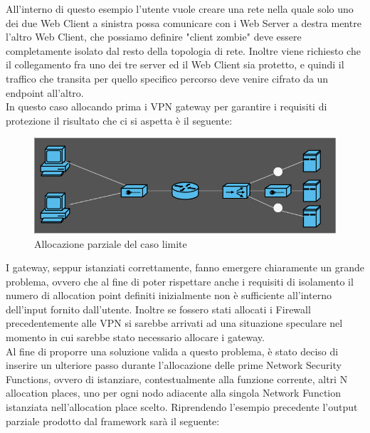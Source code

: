 All'interno di questo esempio l'utente vuole creare una rete nella quale solo uno dei due Web Client a sinistra possa comunicare con i Web Server a destra mentre l'altro Web Client,
che possiamo definire "client zombie" deve essere completamente isolato dal resto della topologia di rete. Inoltre viene richiesto che il collegamento fra uno dei tre server ed il Web Client
sia protetto, e quindi il traffico che transita per quello specifico percorso deve venire cifrato da un endpoint all'altro.\\
In questo caso allocando prima i VPN gateway per garantire i requisiti di protezione il risultato che ci si aspetta è il seguente:


\begin{figure}[h]  %
    \centering
    \includegraphics[width=1\textwidth]{CasoLimite2.png}  %
    \caption{Allocazione parziale del caso limite}
    \label{fig:CasoLimite2}
\end{figure}

I gateway, seppur istanziati correttamente, fanno emergere chiaramente un grande problema, ovvero che al fine di poter rispettare anche i requisiti di
isolamento il numero di allocation point definiti inizialmente non è sufficiente all'interno dell'input fornito dall'utente. Inoltre se fossero stati allocati
i Firewall precedentemente alle VPN si sarebbe arrivati ad una situazione speculare nel momento in cui sarebbe stato necessario allocare i gateway.\\
Al fine di proporre una soluzione valida a questo problema, è stato deciso di inserire un ulteriore passo durante l'allocazione delle prime Network Security Functions,
ovvero di istanziare, contestualmente alla funzione corrente, altri N allocation places, uno per ogni nodo adiacente alla singola Network Function istanziata nell'allocation place 
scelto. Riprendendo l'esempio precedente l'output parziale prodotto dal framework sarà il seguente:


